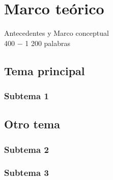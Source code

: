 \newpage

\section{Marco teórico}
\label{Marco teórico}
Antecedentes y Marco conceptual\\
400 − 1 200 palabras\\

\subsection{Tema principal}
\lipsum[7]

\subsubsection{Subtema 1}
\lipsum[8-9]

\subsection{Otro tema}
\lipsum[10-11]

\subsubsection{Subtema 2}
\lipsum[12]

\subsubsection{Subtema 3}
\lipsum[13-14]
